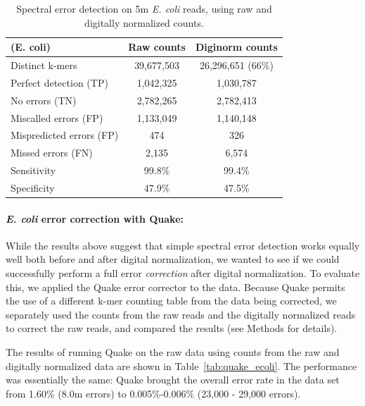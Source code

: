 \documentclass{article}
\begin{document}

\begin{table}
\begin{tabular}{|l|c|c|}
\hline
(E. coli) & Raw counts & Diginorm counts \\
\hline
Distinct k-mers         & 39,677,503 & 26,296,651 (66\%) \\
\hline
Perfect detection (TP)  & 1,042,325 & 1,030,787 \\
No errors (TN)          & 2,782,265 & 2,782,413 \\
Miscalled errors (FP)   & 1,133,049 & 1,140,148 \\
Mispredicted errors (FP)& 474       & 326       \\
Missed errors (FN)      & 2,135     & 6,574     \\
\hline
Sensitivity & 99.8\% & 99.4\% \\
Specificity & 47.9\% & 47.5\% \\
\hline
\end{tabular}
\label{tab:ecoli_dn_counts}

\caption{Spectral error detection on 5m {\em E. coli} reads, using raw and
  digitally normalized counts.}
\end{table}


\paragraph{{\em E. coli} error correction with Quake:}

While the results above suggest that simple spectral error detection
works equally well both before and after digital normalization, we
wanted to see if we could successfully perform a full error {\em
  correction} after digital normalization.  To evaluate this, we
applied the Quake error corrector to the data.  Because Quake permits
the use of a different k-mer counting table from the data being
corrected, we separately used the counts from the raw reads and the
digitally normalized reads to correct the raw reads, and compared the
results (see Methods for details).

The results of running Quake on the raw data using counts from the raw
and digitally normalized data are shown in Table~\ref{tab:quake_ecoli}.
The performance was essentially the same: Quake brought the overall
error rate in the data set from 1.60\% (8.0m errors) to
0.005\%-0.006\% (23,000 - 29,000 errors).
\end{document}
